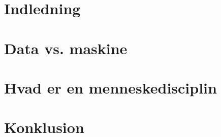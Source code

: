 \documentclass[10pt,a4paper]{article}
\begin{document}
\section{Indledning}

\section{Data vs. maskine}

\section{Hvad er en menneskedisciplin}

\section{Konklusion}
\end{document}
